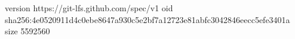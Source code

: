 version https://git-lfs.github.com/spec/v1
oid sha256:4e0520911d4c0ebe8647a930c5e2bf7a12723e81abfc3042846eecc5efe3401a
size 5592560

